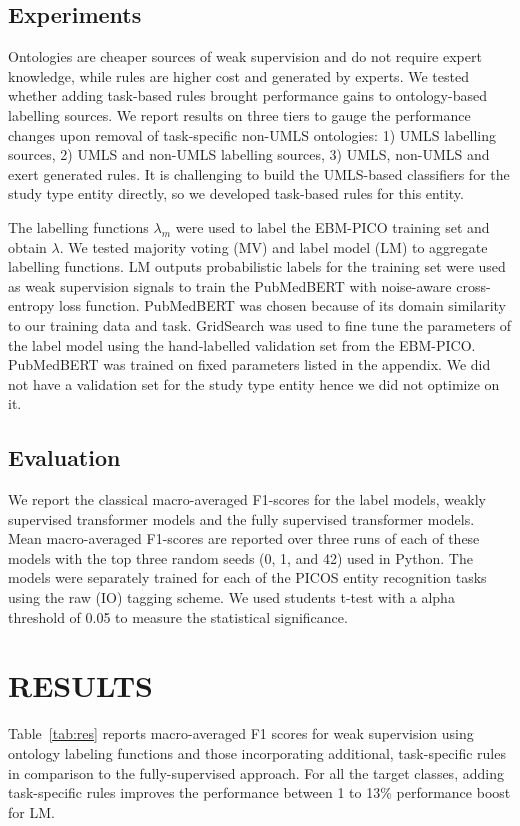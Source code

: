 \documentclass[10.7pt,]{article}
\begin{document}
\subsection{Experiments}\label{transformers}
%
Ontologies are cheaper sources of weak supervision and do not require expert knowledge, while rules are higher cost and generated by experts.
We tested whether adding task-based rules brought performance gains to ontology-based labelling sources.
We report results on three tiers to gauge the performance changes upon removal of task-specific non-UMLS ontologies: 1) UMLS labelling sources, 2) UMLS and non-UMLS labelling sources, 3) UMLS, non-UMLS and exert generated rules. 
It is challenging to build the UMLS-based classifiers for the study type entity directly, so we developed task-based rules for this entity.


The labelling functions $\lambda_{m}$ were used to label the EBM-PICO training set and obtain $\lambda$. 
We tested majority voting (MV) and label model (LM) to aggregate labelling functions.
LM outputs probabilistic labels for the training set were used as weak supervision signals to train the PubMedBERT with noise-aware cross-entropy loss function.
PubMedBERT was chosen because of its domain similarity to our training data and task.
GridSearch was used to fine tune the parameters of the label model using the hand-labelled validation set from the EBM-PICO. %
PubMedBERT was trained on fixed parameters listed in the appendix. %
We did not have a validation set for the study type entity hence we did not optimize on it.


%
%
%
\subsection{Evaluation}\label{eval}
%
We report the classical macro-averaged F1-scores for the label models, weakly supervised transformer models and the fully supervised transformer models.
Mean macro-averaged F1-scores are reported over three runs of each of these models with the top three random seeds (0, 1, and 42) used in Python.
The models were separately trained for each of the PICOS entity recognition tasks using the raw (IO) tagging scheme.
We used students t-test with a alpha threshold of 0.05 to measure the statistical significance.
%
%
%
\section{RESULTS}\label{results}
%
Table~\ref{tab:res} reports macro-averaged F1 scores for weak supervision using ontology labeling functions and those incorporating additional, task-specific rules in comparison to the fully-supervised approach.
For all the target classes, adding task-specific rules improves the performance between 1 to 13\% performance boost for LM. 
\end{document}
